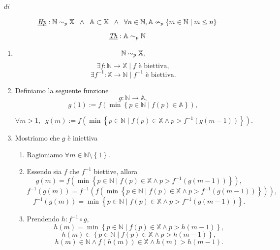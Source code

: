 \begin{demonstration}
    \textit{di} 

    \[ \underbar{\textit{Hp}}: \mathbb{N}\sim_p\mathbb{X} \;\;\land\;\; \mathbb{A} \subset \mathbb{X} \;\;\land\;\; \forall n\in\mathbb{N}, \mathbb{A}\nsim_p \left\{m\in\mathbb{N}\mid m\leq n\right\}\]
    \[ \underbar{\textit{Th}}: \mathbb{A}\sim_p\mathbb{N} \]

    \begin{enumerate}[label=(\roman*)]
        \item
            \[ \mathbb{N}\sim_p\mathbb{X}, \]
            \[ \exists f:\mathbb{N}\rightarrow\mathbb{X} \mid f \text{ è biettiva}, \]
            \[ \exists f^{-1}:\mathbb{X}\rightarrow\mathbb{N} \mid f^{-1} \text{ è biettiva}. \]

        \item Definiamo la seguente funzione
        \[ g:\mathbb{N} \rightarrow \mathbb{A}, \]
        \[ g\left(1\right) := f\left(\min \left\{p\in\mathbb{N}\mid f\left(p\right)\in\mathbb{A}\right\}\right), \]

        \[ \forall m > 1, \;\;g\left(m\right) := f\left( \min \left\{p\in\mathbb{N}\mid f\left(p\right)\in\mathbb{X} \land p > f^{-1}\left(g\left(m-1\right)\right)\right\}\right). \]

        \item Mostriamo che $g$ è iniettiva
        \begin{enumerate}[label=\arabic*.]
            \item Ragioniamo $\forall m \in\mathbb{N}\setminus\left\{1\right\}$.
            \item Essendo sia $f$ che $f^{-1}$ biettive, allora
                \[ g\left(m\right) = f\left( \min \left\{p\in\mathbb{N}\mid f\left(p\right)\in\mathbb{X} \land p > f^{-1}\left(g\left(m-1\right)\right)\right\}\right), \]
                \[ f^{-1}\left(g\left(m\right)\right) = f^{-1}\left(f\left( \min \left\{p\in\mathbb{N}\mid f\left(p\right)\in\mathbb{X} \land p > f^{-1}\left(g\left(m-1\right)\right)\right\}\right)\right), \]
                \[ f^{-1}\left(g\left(m\right)\right) = \min \left\{p\in\mathbb{N}\mid f\left(p\right)\in\mathbb{X} \land p > f^{-1}\left(g\left(m-1\right)\right)\right\}.\]

            \item Prendendo $h:f^{-1}\circ g$,
                \[ h\left(m\right) = \min \left\{p\in\mathbb{N}\mid f\left(p\right)\in\mathbb{X} \land p > h\left(m-1\right)\right\},\]
                \[ h\left(m\right) \in \left\{p\in\mathbb{N}\mid f\left(p\right)\in\mathbb{X} \land p > h\left(m-1\right)\right\},\]
                \[ h\left(m\right) \in\mathbb{N} \land f\left(h\left(m\right)\right)\in\mathbb{X} \land h\left(m\right) > h\left(m-1\right) .\]


\end{enumerate}
\end{enumerate}
\end{demonstration}
